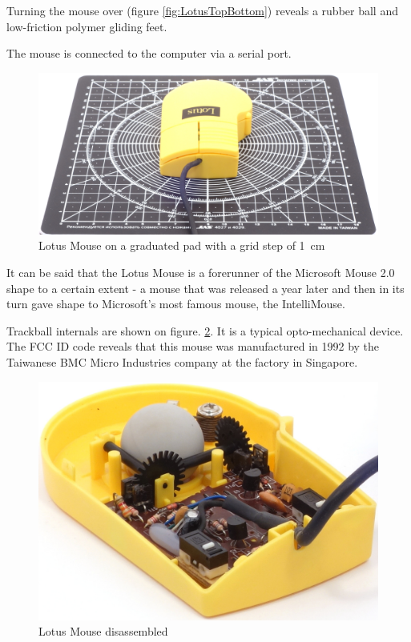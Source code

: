 \documentclass[11pt, a4paper]{article}
\begin{document}
Turning the mouse over (figure \ref{fig:LotusTopBottom}) reveals a rubber ball and low-friction polymer gliding feet.

The mouse is connected to the computer via a serial port.

\begin{figure}[h]
    \centering
    \includegraphics[scale=0.3]{1992_lotus_mouse/size_30.jpg}
    \caption{Lotus Mouse on a graduated pad with a grid step of 1~cm}
    \label{fig:LotusSize}
\end{figure}

It can be said that the Lotus Mouse is a forerunner of the Microsoft Mouse 2.0 shape to a certain extent - a mouse that was released a year later and then in its turn gave shape to Microsoft's most famous mouse, the IntelliMouse.

Trackball internals are shown on figure. \ref{fig:LotusInside}. It is a typical opto-mechanical device. The FCC ID code reveals that this mouse was manufactured in 1992 by the Taiwanese BMC Micro Industries company at the factory in Singapore.

\begin{figure}[h]
    \centering
    \includegraphics[scale=0.7]{1992_lotus_mouse/inside_30.jpg}
    \caption{Lotus Mouse disassembled}
    \label{fig:LotusInside}
\end{figure}
\end{document}

